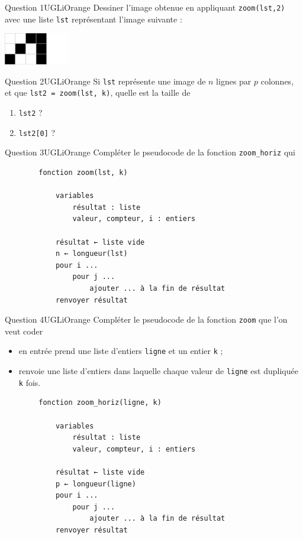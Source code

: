 \documentclass[a4paper,12pt,exos,firamath]{nsi}
\begin{document}
\begin{encadrecolore}{Question 1}{UGLiOrange}
	Dessiner l'image obtenue en appliquant \texttt{zoom(lst,2)} avec une liste \texttt{lst} représentant l'image suivante :
	\begin{center}
		\includegraphics[width=2.8cm]{img/fig2.png}
	\end{center}	  
\end{encadrecolore}

\begin{encadrecolore}{Question 2}{UGLiOrange}
	Si \texttt{lst} représente une image de $n$ lignes par $p$ colonnes, et que \texttt{lst2 = zoom(lst, k)},  quelle est la taille de 
	\begin{enumerate}
		\item	\texttt{lst2} ? 
		\item	\texttt{lst2[0]} ? 
	\end{enumerate}
\end{encadrecolore}

\begin{encadrecolore}{Question 3}{UGLiOrange}
	Compléter le pseudocode de la fonction \texttt{zoom_horiz} qui


	\begin{verbatim}
		fonction zoom(lst, k)
		
			variables
				résultat : liste
				valeur, compteur, i : entiers
				
			résultat ← liste vide
			n ← longueur(lst)
			pour i ...
			    pour j ...    
					ajouter ... à la fin de résultat
			renvoyer résultat
		\end{verbatim}
\end{encadrecolore}

\begin{encadrecolore}{Question 4}{UGLiOrange}
	Compléter le pseudocode de la fonction \texttt{zoom} que l'on veut coder
	\begin{itemize}
		\item	en entrée prend une liste d'entiers \texttt{ligne} et un entier \texttt{k} ; 
		\item	renvoie une liste d'entiers dans laquelle chaque valeur de \texttt{ligne} est dupliquée \texttt{k} fois.  
	\end{itemize} 

	\begin{verbatim}
		fonction zoom_horiz(ligne, k)
		
			variables
				résultat : liste
				valeur, compteur, i : entiers
				
			résultat ← liste vide
			p ← longueur(ligne)
			pour i ...
			    pour j ...    
					ajouter ... à la fin de résultat
			renvoyer résultat
		\end{verbatim}
\end{encadrecolore}
\end{document}
